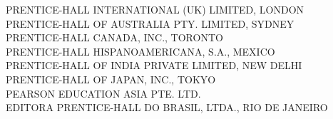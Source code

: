\begin{flushleft}
PRENTICE-HALL INTERNATIONAL (UK) LIMITED, LONDON \\
PRENTICE-HALL OF AUSTRALIA PTY. LIMITED, SYDNEY \\
PRENTICE-HALL CANADA, INC., TORONTO \\
PRENTICE-HALL HISPANOAMERICANA, S.A., MEXICO \\
PRENTICE-HALL OF INDIA PRIVATE LIMITED, NEW DELHI \\
PRENTICE-HALL OF JAPAN, INC., TOKYO \\
PEARSON EDUCATION ASIA PTE. LTD. \\
EDITORA PRENTICE-HALL DO BRASIL, LTDA., RIO DE JANEIRO
\end{flushleft}

\vspace*{\fill}
\newpage